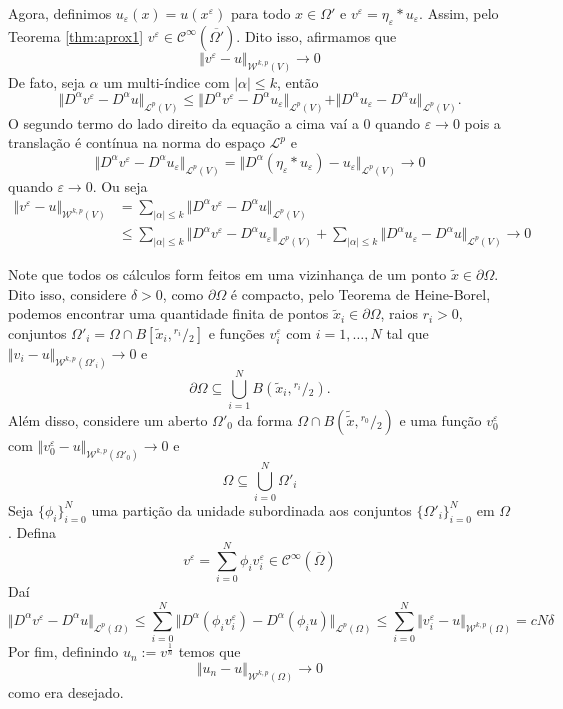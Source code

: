 \documentclass[a4paper, 11pt]{book}
\theoremstyle{definition}
\newcommand{\cC}{\mathcal{C}}
\newcommand{\cL}{\mathcal{L}}
\newcommand{\cW}{\mathcal{W}}
\newcommand{\sfrac}[2]{{}^{#1}\!\!/\!_{#2}}
\begin{document}
\begin{prf}
    Agora, definimos $u_\varepsilon(x) = u(x^\varepsilon)$ para todo $x \in \Omega'$ e $v^\varepsilon = \eta_\varepsilon * u_\varepsilon$. Assim, pelo Teorema \ref{thm:aprox1} $v^\varepsilon \in \cC^{\infty}(\overline{\Omega'})$. 
    Dito isso, afirmamos que
    \[
        \Vert v^\varepsilon - u \Vert_{\cW^{k,p}(V)} \to 0
    \]
    De fato, seja $\alpha $ um multi-índice com $|\alpha| \leqslant k$, então
    \[
        \Vert D^\alpha v^\varepsilon - D^\alpha u \Vert_{\cL^p(V)} \leqslant \Vert D^\alpha v^\varepsilon - D^\alpha u_\varepsilon \Vert_{\cL^p(V)} + \Vert D^\alpha u_\varepsilon - D^\alpha u \Vert_{\cL^p(V)}.
    \]
    O segundo termo do lado direito da equação a cima vaí a $0$ quando $\varepsilon \to 0$ pois a translação é contínua na norma do espaço $\cL^p$ e
    \[
        \Vert D^\alpha v^\varepsilon - D^\alpha u_\varepsilon \Vert_{\cL^p(V)} = \Vert D^\alpha (\eta_\varepsilon * u_\varepsilon) - u_\varepsilon \Vert_{\cL^p(V)} \to 0
    \]
    quando $\varepsilon \to 0$. Ou seja
    \[
        \begin{aligned}
            \Vert v^\varepsilon - u \Vert_{\cW^{k,p}(V)} &= \sum_{|\alpha| \leqslant k} \Vert D^\alpha v^\varepsilon - D^\alpha u \Vert_{\cL^p(V)} \\
            &\leqslant \sum_{|\alpha| \leqslant k} \Vert D^\alpha v^\varepsilon - D^\alpha u_\varepsilon \Vert_{\cL^p(V)} + \sum_{|\alpha| \leqslant k} \Vert D^\alpha u_\varepsilon - D^\alpha u \Vert_{\cL^p(V)} \to 0
        \end{aligned}
    \]

    Note que todos os cálculos form feitos em uma vizinhança de um ponto $\tilde x \in \partial\Omega$. Dito isso, considere $\delta > 0$, como $\partial \Omega$ é compacto, pelo Teorema de Heine-Borel, podemos encontrar uma quantidade finita de pontos $\tilde x_i \in \partial \Omega$, raios $r_i > 0$, conjuntos $\Omega'_i = \Omega \cap B[\tilde x_i,\sfrac{r_i}{2}]$ e funções $v_i^\varepsilon$ com $i = 1,\dots,N$ tal que $\Vert v_i - u \Vert_{\cW^{k,p}(\Omega'_i)} \to 0$ e 
    \[
        \partial\Omega \subseteq \bigcup_{i=1}^N B(\tilde x_i, \sfrac{r_i}{2}).
    \]
    Além disso, considere um aberto $\Omega'_0$ da forma $\Omega \cap B(\tilde \tilde x, \sfrac{r_0}{2})$ e uma função $v^\varepsilon_0$ com $\Vert v^\varepsilon_0 - u \Vert_{\cW^{k,p}(\Omega'_0)} \to 0$ e
    \[
        \Omega \subseteq \bigcup_{i=0}^N \Omega'_i
    \]
    Seja $\{\phi_i\}_{i=0}^N$ uma partição da unidade subordinada aos conjuntos $\{\Omega'_i\}_{i=0}^N$ em $\Omega$.
    Defina
    \[
        v^\varepsilon = \sum_{i=0}^N \phi_i v_i^\varepsilon \in \cC^{\infty}(\overline\Omega)
    \]
    Daí
    \[
        \Vert D^\alpha v^\varepsilon - D^\alpha u \Vert_{\cL^p(\Omega)} \leqslant \sum_{i=0}^N \Vert D^\alpha (\phi_i v_i^\varepsilon) - D^\alpha(\phi_i u) \Vert_{\cL^p(\Omega)} \leqslant \sum_{i=0}^N \Vert v_i^\varepsilon - u \Vert_{\cW^{k,p}(\Omega)} = cN\delta
    \]
    Por fim, definindo $u_n := v^{\frac{1}{n}}$ temos que
    \[
        \Vert u_n - u \Vert_{\cW^{k,p}(\Omega)} \to 0
    \]
    como era desejado.
\end{prf}
\end{document}
